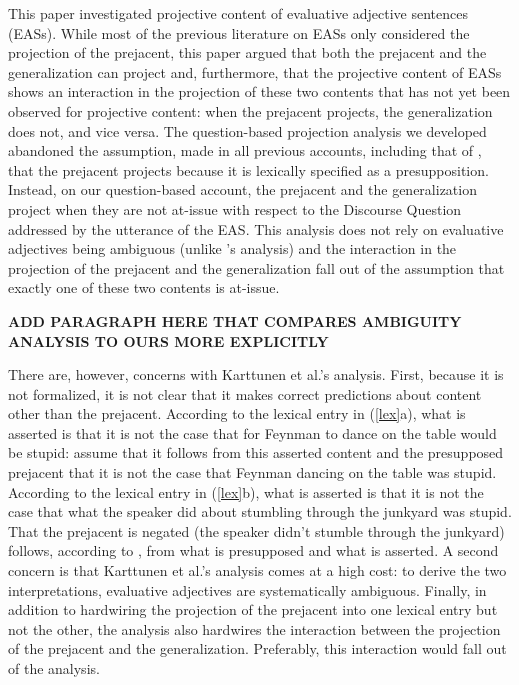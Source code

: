 \documentclass[11pt,fleqn]{article}
\newcommand{\6}{\mbox{$[\hspace*{-.6mm}[$}}
\newcommand{\9}{\mbox{$]\hspace*{-.6mm}]$}}
\newcommand{\citepos}[1]{\citeauthor{#1}'s \citeyear{#1}}
\begin{document}
This paper investigated projective content of evaluative adjective sentences (EASs). While most of the previous literature on EASs only considered the projection of the prejacent, this paper argued that both the prejacent and the generalization can project and, furthermore, that the projective content of EASs shows an interaction in the projection of these two contents that has not yet been observed for projective content: when the prejacent projects, the generalization does not, and vice versa. The question-based projection analysis we developed abandoned the assumption, made in all previous accounts, including that of \citealt{karttunen-etal2014}, that the prejacent projects because it is lexically specified as a presupposition. Instead, on our question-based account, the prejacent and the generalization project when they are not at-issue with respect to the Discourse Question addressed by the utterance of the EAS. This analysis does not rely on evaluative adjectives being ambiguous (unlike \citepos{karttunen-etal2014} analysis) and the interaction in the projection of the prejacent and the generalization fall out of the assumption that exactly one of these two contents is at-issue. {\bf ADD PARAGRAPH HERE THAT COMPARES AMBIGUITY ANALYSIS TO OURS MORE EXPLICITLY

There are, however, concerns with Karttunen et al.'s analysis. First, because it is not formalized, it is not clear that it makes correct predictions about content other than the prejacent. According to the lexical entry in (\ref{lex}a), what is asserted is that it is not the case that for Feynman to dance on the table would be stupid: \citet[248]{karttunen-etal2014} assume that it follows from this asserted content and the presupposed prejacent that it is not the case that Feynman dancing on the table was stupid. According to the lexical entry in (\ref{lex}b), what is asserted is that it is not the case that what the speaker did about stumbling through the junkyard was stupid. That the prejacent is negated (the speaker didn't stumble through the junkyard) follows, according to \citealt[249]{karttunen-etal2014}, from what is presupposed and what is asserted. A second concern is that Karttunen et al.'s analysis comes at a high cost: to derive the two interpretations, evaluative adjectives are systematically ambiguous. Finally, in addition to hardwiring the projection of the prejacent into one lexical entry but not the other, the analysis also hardwires the interaction between the projection of the prejacent and the generalization. Preferably, this interaction would fall out of the analysis. }
\end{document}
